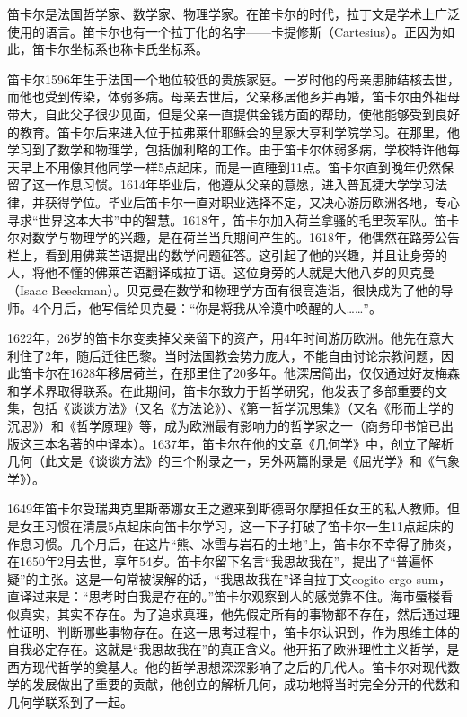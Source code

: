 \documentclass[b5paper]{ctexart}
\begin{document}
\begin{mdframed}
笛卡尔是法国哲学家、数学家、物理学家。在笛卡尔的时代，拉丁文是学术上广泛使用的语言。笛卡尔也有一个拉丁化的名字——卡提修斯（Cartesius）。正因为如此，笛卡尔坐标系也称卡氏坐标系。

笛卡尔1596年生于法国一个地位较低的贵族家庭。一岁时他的母亲患肺结核去世，而他也受到传染，体弱多病。母亲去世后，父亲移居他乡并再婚，笛卡尔由外祖母带大，自此父子很少见面，但是父亲一直提供金钱方面的帮助，使他能够受到良好的教育。笛卡尔后来进入位于拉弗莱什耶稣会的皇家大亨利学院学习。在那里，他学习到了数学和物理学，包括伽利略的工作。由于笛卡尔体弱多病，学校特许他每天早上不用像其他同学一样5点起床，而是一直睡到11点。笛卡尔直到晚年仍然保留了这一作息习惯。1614年毕业后，他遵从父亲的意愿，进入普瓦捷大学学习法律，并获得学位。毕业后笛卡尔一直对职业选择不定，又决心游历欧洲各地，专心寻求“世界这本大书”中的智慧。1618年，笛卡尔加入荷兰拿骚的毛里茨军队。笛卡尔对数学与物理学的兴趣，是在荷兰当兵期间产生的。1618年，他偶然在路旁公告栏上，看到用佛莱芒语提出的数学问题征答。这引起了他的兴趣，并且让身旁的人，将他不懂的佛莱芒语翻译成拉丁语。这位身旁的人就是大他八岁的贝克曼（Isaac Beeckman）。贝克曼在数学和物理学方面有很高造诣，很快成为了他的导师。4个月后，他写信给贝克曼：“你是将我从冷漠中唤醒的人……”。

1622年，26岁的笛卡尔变卖掉父亲留下的资产，用4年时间游历欧洲。他先在意大利住了2年，随后迁往巴黎。当时法国教会势力庞大，不能自由讨论宗教问题，因此笛卡尔在1628年移居荷兰，在那里住了20多年。他深居简出，仅仅通过好友梅森和学术界取得联系。在此期间，笛卡尔致力于哲学研究，他发表了多部重要的文集，包括《谈谈方法》（又名《方法论》）、《第一哲学沉思集》（又名《形而上学的沉思》）和《哲学原理》等，成为欧洲最有影响力的哲学家之一（商务印书馆已出版这三本名著的中译本）。1637年，笛卡尔在他的文章《几何学》中，创立了解析几何（此文是《谈谈方法》的三个附录之一，另外两篇附录是《屈光学》和《气象学》）。

1649年笛卡尔受瑞典克里斯蒂娜女王之邀来到斯德哥尔摩担任女王的私人教师。但是女王习惯在清晨5点起床向笛卡尔学习，这一下子打破了笛卡尔一生11点起床的作息习惯。几个月后，在这片“熊、冰雪与岩石的土地”上，笛卡尔不幸得了肺炎，在1650年2月去世，享年54岁。笛卡尔留下名言“我思故我在”，提出了“普遍怀疑”的主张。这是一句常被误解的话，“我思故我在”译自拉丁文cogito ergo sum，直译过来是：“思考时自我是存在的。”笛卡尔观察到人的感觉靠不住。海市蜃楼看似真实，其实不存在。为了追求真理，他先假定所有的事物都不存在，然后通过理性证明、判断哪些事物存在。在这一思考过程中，笛卡尔认识到，作为思维主体的自我必定存在。这就是“我思故我在”的真正含义。他开拓了欧洲理性主义哲学，是西方现代哲学的奠基人。他的哲学思想深深影响了之后的几代人。笛卡尔对现代数学的发展做出了重要的贡献，他创立的解析几何，成功地将当时完全分开的代数和几何学联系到了一起。
\end{mdframed}
\end{document}
